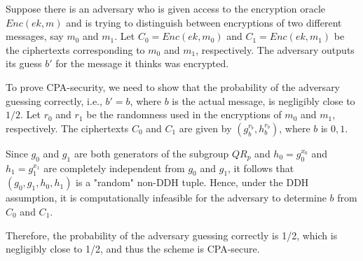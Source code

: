 \begin{itemize}
        Suppose there is an adversary who is given access to the encryption oracle $Enc(ek, m)$
         and is trying to distinguish between encryptions of two different messages, say $m_0$ and $m_1$. 
         Let $C_0 = Enc(ek, m_0)$ and $C_1 = Enc(ek, m_1)$ be the ciphertexts corresponding to $m_0$ and $m_1$, respectively. 
         The adversary outputs its guess $b'$ for the message it thinks was encrypted.
        

        To prove CPA-security, we need to show that the probability of the adversary guessing correctly,
         i.e., $b' = b$, where $b$ is the actual message, is negligibly close to $1/2$. 
         Let $r_0$ and $r_1$ be the randomness used in the encryptions of $m_0$ and $m_1$, respectively. 
         The ciphertexts $C_0$ and $C_1$ are given by $(g_b^{r_b}, h_b^{r_b})$, where $b$ is ${0, 1}$.
        
        Since $g_0$ and $g_1$ are both generators of the subgroup $QR_p$ and $h_0 = g_0^{x_0}$ and $h_1 = g_1^{x_1}$
         are completely independent from $g_0$ and $g_1$, it follows that $(g_0, g_1, h_0, h_1)$ is a "random" non-DDH tuple.
          Hence, under the DDH assumption, it is computationally infeasible for the adversary to determine $b$ from $C_0$ and $C_1$.
        
        Therefore, the probability of the adversary guessing correctly is 1/2, which is negligibly close to 1/2, and thus the scheme is CPA-secure.
        
\end{itemize}